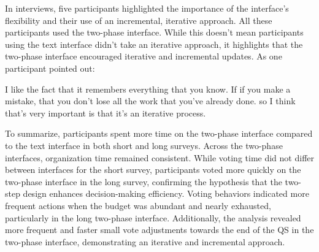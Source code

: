 In interviews, five participants highlighted the importance of the interface's flexibility and their use of an incremental, iterative approach. All these participants used the two-phase interface. While this doesn't mean participants using the text interface didn't take an iterative approach, it highlights that the two-phase interface encouraged iterative and incremental updates. As one participant pointed out:

\begin{displayquote}
I like the fact that it remembers everything that you know. If if you make a mistake, that you don't lose all the work that you've already done. so I think that's very important is that it's an iterative process.\hfill{}
\end{displayquote}

To summarize, participants spent more time on the two-phase interface compared to the text interface in both short and long surveys. Across the two-phase interfaces, organization time remained consistent. While voting time did not differ between interfaces for the short survey, participants voted more quickly on the two-phase interface in the long survey, confirming the hypothesis that the two-step design enhances decision-making efficiency. Voting behaviors indicated more frequent actions when the budget was abundant and nearly exhausted, particularly in the long two-phase interface. Additionally, the analysis revealed more frequent and faster small vote adjustments towards the end of the QS in the two-phase interface, demonstrating an iterative and incremental approach. 


